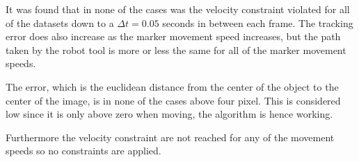 It was found that in none of the cases was the velocity constraint violated for all of the datasets down to a $\Delta t = 0.05$ seconds in between each frame.
The tracking error does also increase as the marker movement speed increases, but the path taken by the robot tool is more or less the same for all of the marker movement speeds.

The error, which is the euclidean distance from the center of the object to the center of the image, is in none of the cases above four pixel.
This is considered low since it is only above zero when moving, the algorithm is hence working.

Furthermore the velocity constraint are not reached for any of the movement speeds so no constraints are applied.



